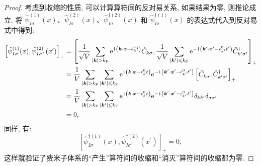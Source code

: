 \begin{proof}考虑到收缩的性质, 可以计算算符间的反对易关系, 如果结果为零, 则推论成立. 将 $\hat{\psi}_{I \sigma}^{(1)}(x)$、$\hat{\psi}_{I \sigma}^{(2)}(x)$、$\hat{\psi}_{I \sigma}^{\dagger(2)}(x)$ 和 $\hat{\psi}_{I \sigma}^{\dagger(1)}(x)$ 的表达式代入到反对易式中得到:
\begin{align}
{\left[\hat{\psi}_{I \sigma}^{(1)}(x), \hat{\psi}_{I \sigma^{\prime}}^{(2)}\left(x^{\prime}\right)\right]_{+} } &=\left[\frac{1}{\sqrt{V}} \sum_{|\vct{k}|>k_{\fun F}} \e^{\ii\left(\vct{k} \cdot \vct{x}-\epsilon_{k}^{0} t\right)} \hat{C}_{k \sigma}, \frac{1}{\sqrt{V}} \sum_{|\vct{k}'| \leqslant k_{\fun F}} \e^{-\ii\left(\vct{k}^{\prime} \cdot \vct{x}^{\prime}-\epsilon_{k^{\prime}}^{0} t^{\prime}\right)} \hat{C}_{k' \sigma'}^{\dagger}\right]_{+} \nonumber\\
&=\frac{1}{V} \sum_{|\vct{k}|>k_{\fun F}} \sum_{|\vct{k}'|\leqslant k_{\fun F}} \e^{\ii\left(\vct{k} \cdot \vct{x}-\epsilon_{k}^{0} t\right)} \e^{-\ii\left(\vct{k}^{\prime} \cdot \vct{x}^{\prime}-\epsilon_{k^{\prime}}^{0} t^{\prime}\right)}\left[\hat{C}_{k \sigma}^{ }, \hat{C}_{k^{\prime} \sigma^{\prime}}^{\dagger}\right]_{+}\nonumber \\
&=\frac{1}{V} \sum_{|\vct{k}|>k_{\fun F}} \sum_{|\vct{k}'| \leqslant k_{\fun F}} \e^{\ii\left(\vct{k} \cdot \vct{x}-\epsilon_{k}^{0} t\right)} \e^{-\ii\left(\vct{k}^{\prime} \cdot \vct{x}^{\prime}-\epsilon_{k^{\prime}}^{0} t^{\prime}\right)} \delta_{k k^{\prime}} \delta_{\sigma \sigma^{\prime}} \nonumber\\
&=0 ,
\end{align}
同样, 有:
\begin{equation}
\left[\hat{\psi}_{I \sigma}^{\dagger(1)}(x), \hat{\psi}_{I \sigma^{\prime}}^{\dagger(2)}\left(x^{\prime}\right)\right]_{+}=0,
\end{equation}
这样就验证了费米子体系的“产生”算符间的收缩和“消灭”算符间的收缩都为零.
\end{proof}

